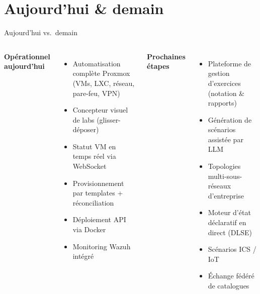 \documentclass[aspectratio=169]{beamer}
\begin{document}
\section{Aujourd'hui \& demain}

\begin{frame}{Aujourd'hui vs.\ demain}
  \begin{columns}[T]
    {\textbf{\faCheckCircle\; Op\'erationnel aujourd'hui}}
    \begin{itemize}
      \item Automatisation compl\`ete Proxmox (VMs, LXC, r\'eseau, pare-feu, VPN)
      \item Concepteur visuel de labs (glisser-d\'eposer)
      \item Statut VM en temps r\'eel via WebSocket
      \item Provisionnement par templates + r\'econciliation
      \item D\'eploiement API via Docker
      \item Monitoring Wazuh int\'egr\'e
    \end{itemize}

    {\textbf{\faRocket\; Prochaines \'etapes}}
    \begin{itemize}
      \item Plateforme de gestion d'exercices (notation \& rapports)
      \item G\'en\'eration de sc\'enarios assist\'ee par LLM
      \item Topologies multi-sous-r\'eseaux d'entreprise
      \item Moteur d'\'etat d\'eclaratif en direct (DLSE)
      \item Sc\'enarios ICS / IoT
      \item \'Echange f\'ed\'er\'e de catalogues
    \end{itemize}
  \end{columns}
\end{frame}
\end{document}
